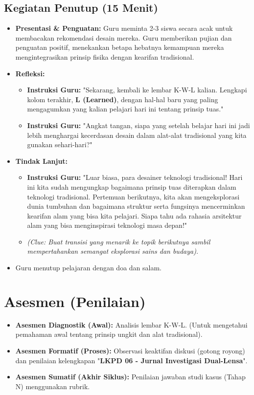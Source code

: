 \documentclass[a4paper,12pt]{article}
\begin{document}
\subsection{Kegiatan Penutup (15 Menit)}
\begin{itemize}
\item \textbf{Presentasi \& Penguatan:} Guru meminta 2-3 siswa secara acak untuk membacakan rekomendasi desain mereka. Guru memberikan pujian dan penguatan positif, menekankan betapa hebatnya kemampuan mereka mengintegrasikan prinsip fisika dengan kearifan tradisional.
\item \textbf{Refleksi:}
    \begin{itemize}
    \item \textbf{Instruksi Guru:} "Sekarang, kembali ke lembar K-W-L kalian. Lengkapi kolom terakhir, \textbf{L (Learned)}, dengan hal-hal baru yang paling mengagumkan yang kalian pelajari hari ini tentang prinsip tuas."
    \item \textbf{Instruksi Guru:} "Angkat tangan, siapa yang setelah belajar hari ini jadi lebih menghargai kecerdasan desain dalam alat-alat tradisional yang kita gunakan sehari-hari?"
    \end{itemize}
\item \textbf{Tindak Lanjut:}
    \begin{itemize}
    \item \textbf{Instruksi Guru:} "Luar biasa, para desainer teknologi tradisional! Hari ini kita sudah mengungkap bagaimana prinsip tuas diterapkan dalam teknologi tradisional. Pertemuan berikutnya, kita akan mengeksplorasi dunia tumbuhan dan bagaimana struktur serta fungsinya mencerminkan kearifan alam yang bisa kita pelajari. Siapa tahu ada rahasia arsitektur alam yang bisa menginspirasi teknologi masa depan!"
    \item \textit{(Clue: Buat transisi yang menarik ke topik berikutnya sambil mempertahankan semangat eksplorasi sains dan budaya).}
    \end{itemize}
\item Guru menutup pelajaran dengan doa dan salam.
\end{itemize}

\section{Asesmen (Penilaian)}

\begin{itemize}
\item \textbf{Asesmen Diagnostik (Awal):} Analisis lembar K-W-L. (Untuk mengetahui pemahaman awal tentang prinsip ungkit dan alat tradisional).
\item \textbf{Asesmen Formatif (Proses):} Observasi keaktifan diskusi (gotong royong) dan penilaian kelengkapan "\textbf{LKPD 06 - Jurnal Investigasi Dual-Lensa}".
\item \textbf{Asesmen Sumatif (Akhir Siklus):} Penilaian jawaban studi kasus (Tahap N) menggunakan rubrik.
\end{itemize}
\end{document}

